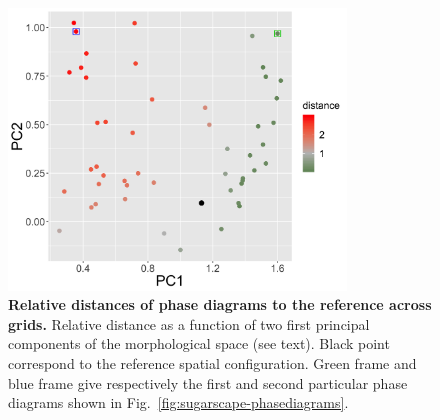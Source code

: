 \documentclass{JASSS}
\begin{document}

\begin{figure}[!t]
\centering
	\includegraphics[width=0.8\textwidth]{figures/Fig5.png}
\caption{\textbf{Relative distances of phase diagrams to the reference across grids.} Relative distance as a function of two first principal components of the morphological space (see text). Black point correspond to the reference spatial configuration. Green frame and blue frame give respectively the first and second particular phase diagrams shown in Fig.~\ref{fig:sugarscape-phasediagrams}.}
\label{fig:sugarscape-distance-pca}
\end{figure}
\end{document}
